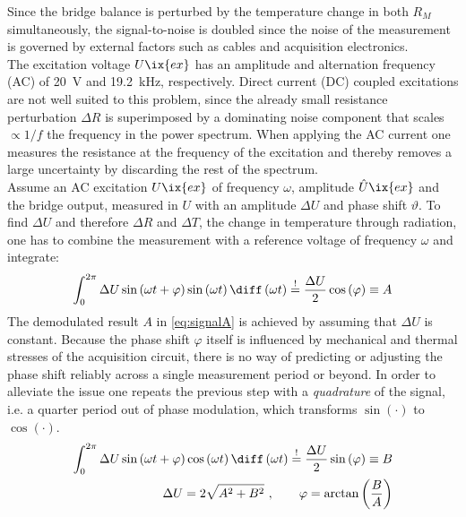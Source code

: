 %
                Since the bridge balance is perturbed by the temperature change in both $R_{M}$ simultaneously, the signal-to-noise is doubled since the noise of the measurement is governed by external factors such as cables and acquisition electronics.\\%
                The excitation voltage $U\ix{ex}$ has an amplitude and alternation frequency (AC) of \SI{20}{\volt} and \SI{19.2}{\kilo\hertz}, respectively. Direct current (DC) coupled excitations are not well suited to this problem, since the already small resistance perturbation $\Delta R$ is superimposed by a dominating noise component that scales $\propto 1/f$ the frequency in the power spectrum\cite{Horowitz1989,Weissman1988}. When applying the AC current one measures the resistance at the frequency of the excitation and thereby removes a large uncertainty by discarding the rest of the spectrum.\\%
                Assume an AC excitation $U\ix{ex}$ of frequency $\omega$, amplitude $\hat{U}\ix{ex}$ and the bridge output, measured in $U$ with an amplitude $\Delta U$ and phase shift $\vartheta$. To find $\Delta U$ and therefore $\Delta R$ and $\Delta T$, the change in temperature through radiation, one has to combine the measurement with a reference voltage of frequency $\omega$ and integrate:%
%
                \begin{align}%
                    \int_{0}^{2\pi}\Delta U\sin\left(\omega t+\varphi\right)\sin\left(\omega t\right)\diff \left(\omega t\right)\overset{!}{=}\frac{\Delta U}{2}\cos\left(\varphi\right)\equiv A\label{eq:signalA}%
                \end{align}%
%
                The demodulated result $A$ in \cref{eq:signalA} is achieved by assuming that $\Delta U$ is constant. Because the phase shift $\varphi$ itself is influenced by mechanical and thermal stresses of the acquisition circuit, there is no way of predicting or adjusting the phase shift reliably across a single measurement period or beyond. In order to alleviate the issue one repeats the previous step with a \textit{quadrature} of the signal, i.e. a quarter period out of phase modulation, which transforms $\sin\left(\cdot\right)$ to $\cos\left(\cdot\right)$.
%
                \begin{align}%
                    \begin{split}%
                        \int_{0}^{2\pi}\Delta U\sin\left(\omega t+\varphi\right)\cos\left(\omega t\right)\diff \left(\omega t\right)\overset{!}{=}\frac{\Delta U}{2}\sin\left(\varphi\right)\equiv B\\%
                        \Delta U=2\sqrt{A^{2}+B^{2}}\,\,,\qquad \varphi=\arctan\left(\frac{B}{A}\right)%
                    \end{split}\label{eq:wheatstone_delta}%
                \end{align}%
